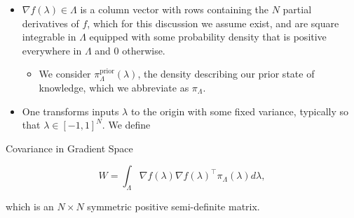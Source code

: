 \documentclass[11pt]{beamer}
\begin{document}
\begin{frame}

\begin{itemize}

\item $\nabla f(\lambda)\in \Lambda$ is a column vector with rows containing the $N$ partial derivatives of $f$, which for this discussion we assume exist, and are square integrable in $\Lambda$ equipped with some probability density that is positive everywhere in $\Lambda$ and 0 otherwise.

\begin{itemize}
		\item We consider $\pi_\Lambda^\text{prior}(\lambda)$, the density describing our prior state of knowledge, which we abbreviate as $\pi_\Lambda$.
\end{itemize}

\item One transforms inputs $\lambda$ to the origin with some fixed variance, typically so that $\lambda\in [-1,1]^N$. We define

\end{itemize}

\begin{block}{Covariance in Gradient Space \footnotemark[1]}

\begin{equation} \label{eq:4}
W=\int_\Lambda \nabla f(\lambda) \nabla f(\lambda)^\top  \pi_\Lambda(\lambda) d\lambda,
\end{equation} 

\noindent which is an $N\times N$ symmetric positive semi-definite matrix.

\end{block}



\end{frame}
\end{document}
